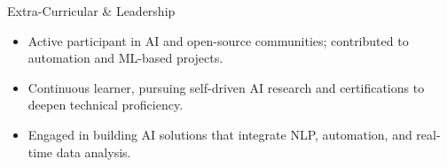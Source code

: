 \documentclass{resume}
\begin{document}

\begin{rSection}{Extra-Curricular \& Leadership}

\begin{itemize}
    \item Active participant in AI and open-source communities; contributed to automation and ML-based projects.
    \item Continuous learner, pursuing self-driven AI research and certifications to deepen technical proficiency.
    \item Engaged in building AI solutions that integrate NLP, automation, and real-time data analysis.
\end{itemize}

\end{rSection}
\end{document}
